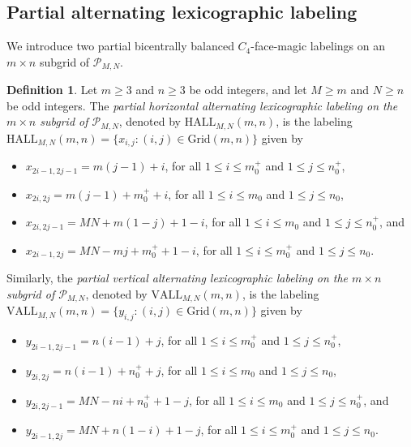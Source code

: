 \documentclass[12pt]{amsart}
\theoremstyle{definition}
\newtheorem{definition}{Definition}
\theoremstyle{plain}
\begin{document}
\subsection{Partial alternating lexicographic labeling}

We introduce two partial bicentrally balanced $C_4$-face-magic labelings on an $m \times n$ subgrid of $\mathcal{P}_{M,N}$.

\begin{definition} \label{defnBaseAlternatingLexicographicLabeling}
  Let $m\geqslant 3$ and $n \geqslant 3$ be odd integers, and let $M \geqslant m$ and $N \geqslant n$ be odd integers.
  The \textit{partial horizontal alternating lexicographic labeling on the $m \times n$ subgrid of $\mathcal{P}_{M,N}$},
  denoted by $\mathrm{HALL}_{M,N}(m,n)$, is the labeling
  $\mathrm{HALL}_{M,N}(m,n)=\{x_{i,j} : (i,j)\in \mathrm{Grid}(m,n) \}$ given by
  \begin{itemize}
  \item $x_{2i-1,2j-1} = m(j-1)+i$, for all $1 \leqslant i \leqslant m^{+}_0$ and $1 \leqslant j \leqslant n^{+}_0$,
  \item $x_{2i,2j} = m(j-1)+ m^{+}_0 +i$, for all $1 \leqslant i \leqslant m_0$ and $1 \leqslant j \leqslant n_0$,
  \item $x_{2i,2j-1} = MN+ m(1-j)+ 1 -i$, for all $1 \leqslant i \leqslant m_0$ and $1 \leqslant j \leqslant n^{+}_0$, and
  \item $x_{2i-1,2j} = MN - mj+ m^{+}_0 +1 -i$, for all $1 \leqslant i \leqslant m^{+}_0$ and $1 \leqslant j \leqslant n_0$.
  \end{itemize}

  Similarly, the \textit{partial vertical alternating lexicographic labeling on the $m \times n$ subgrid of $\mathcal{P}_{M,N}$},
  denoted by $\mathrm{VALL}_{M,N}(m,n)$, is the labeling
  $\mathrm{VALL}_{M,N}(m,n)=\{y_{i,j} : (i,j)\in \mathrm{Grid}(m,n) \}$ given by
  \begin{itemize}
  \item $y_{2i-1,2j-1} = n(i-1)+j$, for all $1 \leqslant i \leqslant m^{+}_0$ and $1 \leqslant j \leqslant n^{+}_0$,
  \item $y_{2i,2j} = n(i-1)+ n^{+}_0 +j$, for all $1 \leqslant i \leqslant m_0$ and $1 \leqslant j \leqslant n_0$,
  \item $y_{2i,2j-1} = MN - ni + n^{+}_0 + 1 -j$, for all $1 \leqslant i \leqslant m_0$ and $1 \leqslant j \leqslant n^{+}_0$, and
  \item $y_{2i-1,2j} = MN + n(1-i) +1 -j$, for all $1 \leqslant i \leqslant m^{+}_0$ and $1 \leqslant j \leqslant n_0$.
  \end{itemize}
\end{definition}
\end{document}
